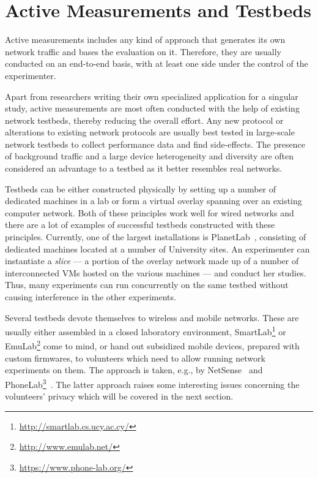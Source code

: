 \section{Active Measurements and Testbeds}
\label{c6:sec:active-measurements}

Active measurements includes any kind of approach that generates its own network traffic and bases the evaluation on it. Therefore, they are usually conducted on an end-to-end basis, with at least one side under the control of the experimenter.

Apart from researchers writing their own specialized application for a singular study, active measurements are most often conducted with the help of existing network testbeds, thereby reducing the overall effort. Any new protocol or alterations to existing network protocols are usually best tested in large-scale network testbeds to collect performance data and find side-effects. The presence of background traffic and a large device heterogeneity and diversity are often considered an advantage to a testbed as it better resembles real networks.

Testbeds can be either constructed physically by setting up a number of dedicated machines in a lab or form a virtual overlay spanning over an existing computer network. Both of these principles work well for wired networks and there are a lot of examples of successful testbeds constructed with these principles. Currently, one of the largest installations is PlanetLab~\cite{chun2003planetlab}, consisting of dedicated machines located at a number of University sites. An experimenter can instantiate a \textit{slice} --- a portion of the overlay network made up of a number of interconnected \glspl{VM} hosted on the various machines --- and conduct her studies. Thus, many experiments can run concurrently on the same testbed without causing interference in the other experiments.

Several testbeds devote themselves to wireless and mobile networks. These are usually either assembled in a closed laboratory environment, SmartLab\footnote{\url{http://smartlab.cs.ucy.ac.cy/}} or EmuLab\footnote{\url{http://www.emulab.net/}} come to mind, or hand out subsidized mobile devices, prepared with custom firmwares, to volunteers which need to allow running network experiments on them. The approach is taken, e.g., by NetSense~\cite{Striegel:2013:LLN:2491159.2491171} and PhoneLab\footnote{\url{https://www.phone-lab.org/}}~\cite{Nandugudi:2013:PLP:2536714.2536718}. The latter approach raises some interesting issues concerning the volunteers' privacy which will be covered in the next section.

